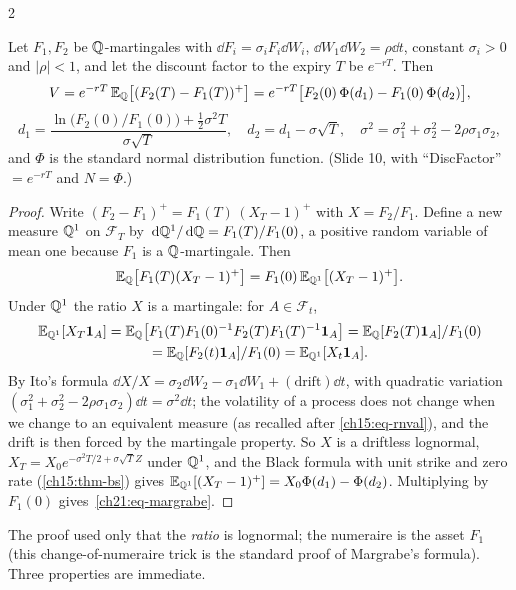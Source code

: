 \begin{paracol}{2}
\begin{theorem}\label{ch21:thm-margrabe}
Let $F_1,F_2$ be $\mathbb{Q}$-martingales with $\dd F_i=\sigma_iF_i\dd W_i$, $\dd W_1\dd W_2=\rho\dd t$, constant $\sigma_i>0$ and $|\rho|<1$, and let the discount factor to the expiry $T$ be $e^{-rT}$. Then
\begin{equation}\label{ch21:eq-margrabe}
  V=e^{-rT}\,\mathbb{E}_{\mathbb{Q}}\bigl[(F_2(T)-F_1(T))^+\bigr]=e^{-rT}\bigl[F_2(0)\,\Phi(d_1)-F_1(0)\,\Phi(d_2)\bigr],
\end{equation}
\[
  d_1=\frac{\ln\bigl(F_2(0)/F_1(0)\bigr)+\tfrac12\sigma^2T}{\sigma\sqrt T},\quad d_2=d_1-\sigma\sqrt T,\quad \sigma^2=\sigma_1^2+\sigma_2^2-2\rho\sigma_1\sigma_2,
\]
and $\Phi$ is the standard normal distribution function. (Slide 10, with ``DiscFactor'' $=e^{-rT}$ and $N=\Phi$.)
\end{theorem}
\begin{proof}
Write $(F_2-F_1)^+=F_1(T)\,(X_T-1)^+$ with $X=F_2/F_1$. Define a new measure $\mathbb{Q}^1$ on $\mathcal F_T$ by $\,\mathrm{d}\mathbb{Q}^1/\,\mathrm{d}\mathbb{Q}=F_1(T)/F_1(0)$, a positive random variable of mean one because $F_1$ is a
$\mathbb{Q}$-martingale. Then
\[
  \mathbb{E}_{\mathbb{Q}}\bigl[F_1(T)(X_T-1)^+\bigr]=F_1(0)\,\mathbb{E}_{\mathbb{Q}^1}\bigl[(X_T-1)^+\bigr].
\]
Under $\mathbb{Q}^1$ the ratio $X$ is a martingale: for $A\in\mathcal F_t$,
\[
\begin{gathered}
\mathbb{E}_{\mathbb{Q}^1}[X_T\mathbf{1}_A]=\mathbb{E}_{\mathbb{Q}}\bigl[F_1(T)F_1(0)^{-1}F_2(T)F_1(T)^{-1}\mathbf{1}_A\bigr]=\mathbb{E}_{\mathbb{Q}}[F_2(T)\mathbf{1}_A]/F_1(0)\\
=\mathbb{E}_{\mathbb{Q}}[F_2(t)\mathbf{1}_A]/F_1(0)=\mathbb{E}_{\mathbb{Q}^1}[X_t\mathbf{1}_A].
\end{gathered}
\]
By Ito's formula $\dd X/X=\sigma_2\dd W_2-\sigma_1\dd W_1+(\text{drift})\dd t$, with quadratic variation $(\sigma_1^2+\sigma_2^2-2\rho\sigma_1\sigma_2)\dd t=\sigma^2\dd t$; the volatility of a process does not change when we change to an equivalent measure
(as recalled after \cref{ch15:eq-rnval}), and the drift is then forced by the martingale property. So $X$ is a driftless lognormal, $X_T=X_0e^{-\sigma^2T/2+\sigma\sqrt T Z}$ under $\mathbb{Q}^1$, and the Black formula with unit strike and zero rate (\cref{ch15:thm-bs})
gives $\mathbb{E}_{\mathbb{Q}^1}[(X_T-1)^+]=X_0\Phi(d_1)-\Phi(d_2)$. Multiplying by $F_1(0)$ gives~\eqref{ch21:eq-margrabe}.
\end{proof}

The proof used only that the \emph{ratio} is lognormal; the numeraire is the asset $F_1$ (this change-of-numeraire trick is the standard proof of Margrabe's formula). Three properties are immediate.


\end{paracol}
